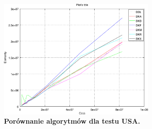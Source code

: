 \begin{figure}[!htbp]
	\centering
	\includegraphics[width=0.7\textwidth]{Chapter_IV/USA-road-d.pdf}
	\caption{\textbf{ Porównanie algorytmów dla testu \textsc{USA}.}}\label{fig:plotUSA-road-d}
\end{figure}

